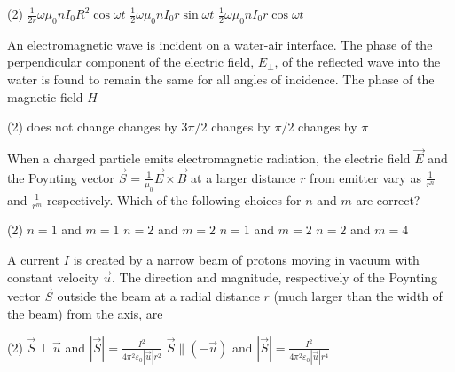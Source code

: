 \begin{enumerate}
\begin{minipage}{\textwidth}
\end{minipage}
\begin{tasks}(2)
	\task[\textbf{B.}]$\frac{1}{2 r} \omega \mu_{0} n I_{0} R^{2} \cos \omega t$
	\task[\textbf{C.}]$\frac{1}{2} \omega \mu_{0} n I_{0} r \sin \omega t$
	\task[\textbf{D.}]$\frac{1}{2} \omega \mu_{0} n I_{0} r \cos \omega t$
\end{tasks}
\begin{minipage}{\textwidth}
	\item An electromagnetic wave is incident on a water-air interface. The phase of the perpendicular component of the electric field, $E_{\perp}$, of the reflected wave into the water is found to remain the same for all angles of incidence. The phase of the magnetic field $H$
\end{minipage}
\begin{tasks}(2)
	\task[\textbf{A.}]does not change
	\task[\textbf{B.}]changes by $3 \pi / 2$
	\task[\textbf{C.}]changes by $\pi / 2$
	\task[\textbf{D.}]changes by $\pi$
\end{tasks}
\begin{minipage}{\textwidth}
	\item When a charged particle emits electromagnetic radiation, the electric field $\vec{E}$ and the Poynting vector $\vec{S}=\frac{1}{\mu_{0}} \vec{E} \times \vec{B}$ at a larger distance $r$ from emitter vary as $\frac{1}{r^{n}}$ and $\frac{1}{r^{m}}$ respectively. Which of the following choices for $n$ and $m$ are correct?
\end{minipage}
\begin{tasks}(2)
	\task[\textbf{A.}] $n=1$ and $m=1$
	\task[\textbf{B.}]$n=2$ and $m=2$
	\task[\textbf{C.}]$n=1$ and $m=2$
	\task[\textbf{D.}] $n=2$ and $m=4$
\end{tasks}
\begin{minipage}{\textwidth}
	\item A current $I$ is created by a narrow beam of protons moving in vacuum with constant velocity $\vec{u}$. The direction and magnitude, respectively of the Poynting vector $\vec{S}$ outside the beam at a radial distance $r$ (much larger than the width of the beam) from the axis, are
\end{minipage}
\begin{tasks}(2)
	\task[\textbf{A.}] $\vec{S} \perp \vec{u}$ and $|\vec{S}|=\frac{I^{2}}{4 \pi^{2} \varepsilon_{0}|\vec{u}| r^{2}}$
	\task[\textbf{B.}]$\vec{S} \|(-\vec{u})$ and $|\vec{S}|=\frac{I^{2}}{4 \pi^{2} \varepsilon_{0}|\vec{u}| r^{4}}$

\end{tasks}
\end{enumerate}
